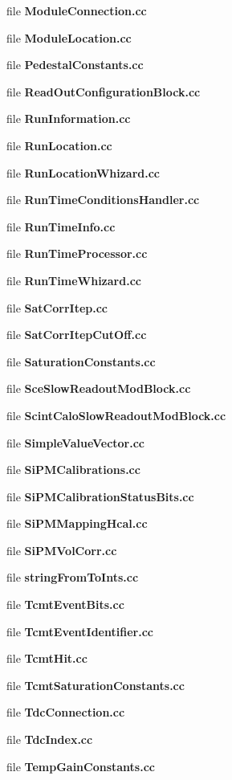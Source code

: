 \begin{DoxyCompactItemize}
\item 
file {\bfseries Module\-Connection.\-cc}
\item 
file {\bfseries Module\-Location.\-cc}
\item 
file {\bfseries Pedestal\-Constants.\-cc}
\item 
file {\bfseries Read\-Out\-Configuration\-Block.\-cc}
\item 
file {\bfseries Run\-Information.\-cc}
\item 
file {\bfseries Run\-Location.\-cc}
\item 
file {\bfseries Run\-Location\-Whizard.\-cc}
\item 
file {\bfseries Run\-Time\-Conditions\-Handler.\-cc}
\item 
file {\bfseries Run\-Time\-Info.\-cc}
\item 
file {\bfseries Run\-Time\-Processor.\-cc}
\item 
file {\bfseries Run\-Time\-Whizard.\-cc}
\item 
file {\bfseries Sat\-Corr\-Itep.\-cc}
\item 
file {\bfseries Sat\-Corr\-Itep\-Cut\-Off.\-cc}
\item 
file {\bfseries Saturation\-Constants.\-cc}
\item 
file {\bfseries Sce\-Slow\-Readout\-Mod\-Block.\-cc}
\item 
file {\bfseries Scint\-Calo\-Slow\-Readout\-Mod\-Block.\-cc}
\item 
file {\bfseries Simple\-Value\-Vector.\-cc}
\item 
file {\bfseries Si\-P\-M\-Calibrations.\-cc}
\item 
file {\bfseries Si\-P\-M\-Calibration\-Status\-Bits.\-cc}
\item 
file {\bfseries Si\-P\-M\-Mapping\-Hcal.\-cc}
\item 
file {\bfseries Si\-P\-M\-Vol\-Corr.\-cc}
\item 
file {\bfseries string\-From\-To\-Ints.\-cc}
\item 
file {\bfseries Tcmt\-Event\-Bits.\-cc}
\item 
file {\bfseries Tcmt\-Event\-Identifier.\-cc}
\item 
file {\bfseries Tcmt\-Hit.\-cc}
\item 
file {\bfseries Tcmt\-Saturation\-Constants.\-cc}
\item 
file {\bfseries Tdc\-Connection.\-cc}
\item 
file {\bfseries Tdc\-Index.\-cc}
\item 
file {\bfseries Temp\-Gain\-Constants.\-cc}

\end{DoxyCompactItemize}
